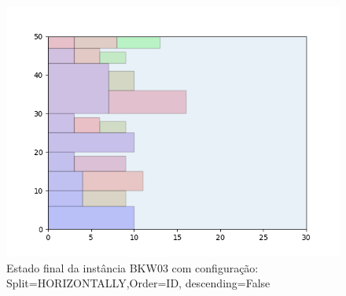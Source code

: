 \begin{figure}[H]
    \centering
    \caption[]{Estado final da instância BKW03 com configuração: Split=HORIZONTALLY,Order=ID, descending=False}
    \label{fig:bkw03-horizontally-id-false}
    \includegraphics[scale=0.5]{output/figures/bkw/bkw03/horizontally/id/false/00}
\end{figure}